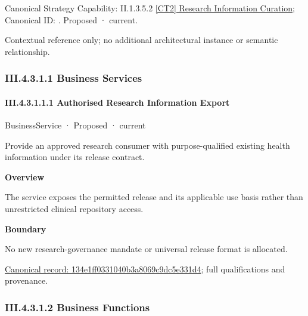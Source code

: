 {\small Canonical Strategy Capability: II.1.3.5.2 \hyperref[element:4f5b8cec90324c2989cdc30e80bc8cb9]{[CT2] Research Information Curation}; Canonical ID: \texttt{}. Proposed · current.}\par
Contextual reference only; no additional architectural instance or semantic relationship.\par
\subsubsection*{III.4.3.1.1 Business Services}
\label{navigation:III.4.3.1.1}

\paragraph*{III.4.3.1.1.1 Authorised Research Information Export}
\label{navigation:III.4.3.1.1.1}

\label{element:134e1ff0331040b3a8069c9dc5e331d4}
{\small BusinessService · Proposed · current}\par

Provide an approved research consumer with purpose-qualified existing health information under its release contract.



\textbf{Overview}



The service exposes the permitted release and its applicable use basis rather than unrestricted clinical repository access.



\textbf{Boundary}



No new research-governance mandate or universal release format is allocated.


{\footnotesize \href{../../../../continuum/business/business-service/134e1ff0331040b3a8069c9dc5e331d4.md}{Canonical record: 134e1ff0331040b3a8069c9dc5e331d4}; full qualifications and provenance.}\par
\subsubsection*{III.4.3.1.2 Business Functions}
\label{navigation:III.4.3.1.2}

